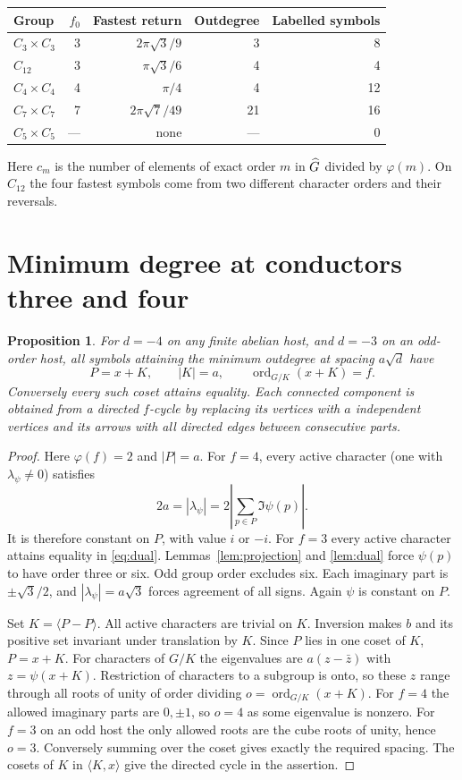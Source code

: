 \documentclass[11pt]{article}
\newtheorem{proposition}[theorem]{Proposition}
\newcommand{\ord}{\operatorname{ord}}\newcommand{\rk}{\operatorname{rank}}
\begin{document}
\begin{center}
\begin{tabular}{lrrrr}
\toprule
Group & $f_0$ & Fastest return & Outdegree & Labelled symbols\\
\midrule
$C_3\times C_3$ & 3 & $2\pi\sqrt3/9$ & 3 & 8\\
$C_{12}$ & 3 & $\pi\sqrt3/6$ & 4 & 4\\
$C_4\times C_4$ & 4 & $\pi/4$ & 4 & 12\\
$C_7\times C_7$ & 7 & $2\pi\sqrt7/49$ & 21 & 16\\
$C_5\times C_5$ & --- & none & --- & 0\\
\bottomrule
\end{tabular}
\end{center}
Here $c_m$ is the number of elements of exact order $m$ in $\widehat G$ divided by $\varphi(m)$. On $C_{12}$ the four fastest symbols come from two different character orders and their reversals.

\section{Minimum degree at conductors three and four}
\begin{proposition}\label{prop:coset}
For $d=-4$ on any finite abelian host, and $d=-3$ on an odd-order host, all symbols attaining the minimum outdegree at spacing $a\sqrt d$ have
\[
                P=x+K,\qquad |K|=a,\qquad \ord_{G/K}(x+K)=f .
\]
Conversely every such coset attains equality. Each connected component is obtained from a directed $f$-cycle by replacing its vertices with $a$ independent vertices and its arrows with all directed edges between consecutive parts.
\end{proposition}
\begin{proof}
Here $\varphi(f)=2$ and $|P|=a$. For $f=4$, every active character (one with $\lambda_\psi\ne0$) satisfies
\[
           2a=|\lambda_\psi|=2\left|\sum_{p\in P}\Im\psi(p)\right|.
\]
It is therefore constant on $P$, with value $i$ or $-i$. For $f=3$ every active character attains equality in \eqref{eq:dual}. Lemmas~\ref{lem:projection} and \ref{lem:dual} force $\psi(p)$ to have order three or six. Odd group order excludes six. Each imaginary part is $\pm\sqrt3/2$, and $|\lambda_\psi|=a\sqrt3$ forces agreement of all signs. Again $\psi$ is constant on $P$.

Set $K=\langle P-P\rangle$. All active characters are trivial on $K$. Inversion makes $b$ and its positive set invariant under translation by $K$. Since $P$ lies in one coset of $K$, $P=x+K$. For characters of $G/K$ the eigenvalues are $a(z-\bar z)$ with $z=\psi(x+K)$. Restriction of characters to a subgroup is onto, so these $z$ range through all roots of unity of order dividing $o=\ord_{G/K}(x+K)$. For $f=4$ the allowed imaginary parts are $0,\pm1$, so $o=4$ as some eigenvalue is nonzero. For $f=3$ on an odd host the only allowed roots are the cube roots of unity, hence $o=3$. Conversely summing over the coset gives exactly the required spacing. The cosets of $K$ in $\langle K,x\rangle$ give the directed cycle in the assertion.
\end{proof}
\end{document}
